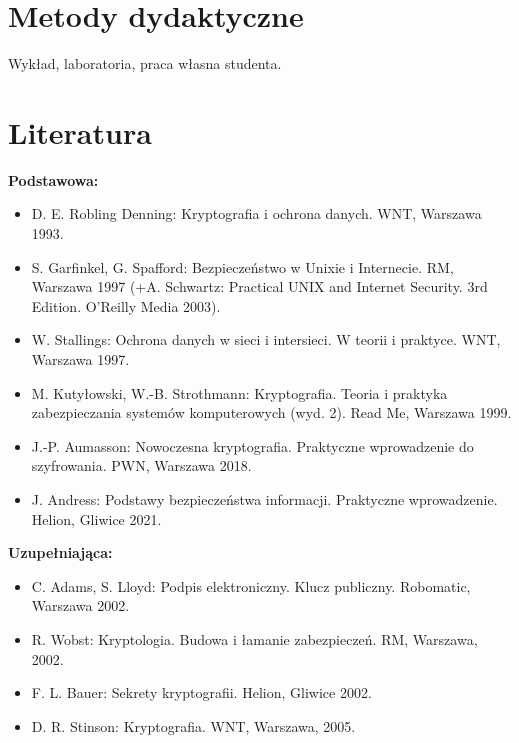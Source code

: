 \documentclass[12pt, a4paper]{article}
\begin{document}
\section{Metody dydaktyczne}

Wykład, laboratoria, praca własna studenta.

\section{Literatura}

\textbf{Podstawowa:}
\begin{itemize}
  \item D. E. Robling Denning: Kryptografia i ochrona danych. WNT, Warszawa 1993.
  \item S. Garfinkel, G. Spafford: Bezpieczeństwo w Unixie i Internecie. RM, Warszawa 1997 (+A. Schwartz: Practical UNIX and Internet Security. 3rd Edition. O'Reilly Media 2003).
  \item W. Stallings: Ochrona danych w sieci i intersieci. W teorii i praktyce. WNT, Warszawa 1997.
  \item M. Kutyłowski, W.-B. Strothmann: Kryptografia. Teoria i praktyka zabezpieczania systemów komputerowych (wyd. 2). Read Me, Warszawa 1999.
  \item J.-P. Aumasson: Nowoczesna kryptografia. Praktyczne wprowadzenie do szyfrowania. PWN, Warszawa 2018.
  \item J. Andress: Podstawy bezpieczeństwa informacji. Praktyczne wprowadzenie. Helion, Gliwice 2021.
\end{itemize}

\textbf{Uzupełniająca:}
\begin{itemize}
  \item C. Adams, S. Lloyd: Podpis elektroniczny. Klucz publiczny. Robomatic, Warszawa 2002.
  \item R. Wobst: Kryptologia. Budowa i łamanie zabezpieczeń. RM, Warszawa, 2002.
  \item F. L. Bauer: Sekrety kryptografii. Helion, Gliwice 2002.
  \item D. R. Stinson: Kryptografia. WNT, Warszawa, 2005.
\end{itemize}
\end{document}
